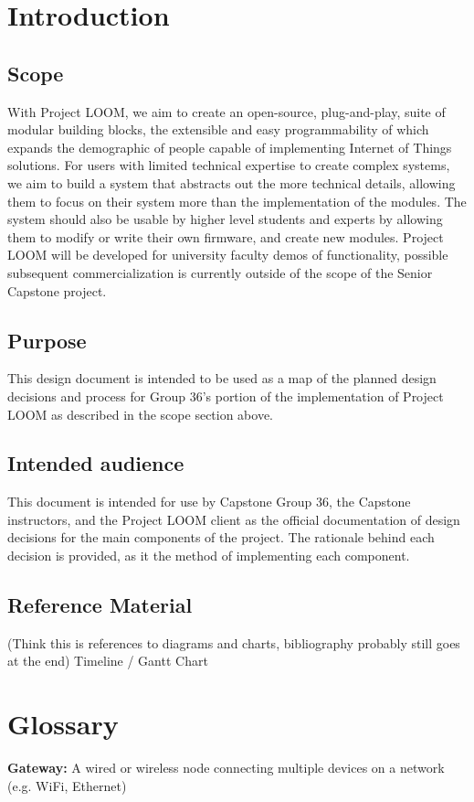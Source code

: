 \documentclass[onecolumn, draftclsnofoot,10pt, compsoc]{IEEEtran}
\begin{document}
\section{Introduction}
\subsection{Scope}  
With Project LOOM, we aim to create an open-source, plug-and-play, suite of modular building blocks, the extensible and easy programmability of which expands the demographic of people capable of implementing Internet of Things solutions. For users with limited technical expertise to create complex systems, we aim to build a system that abstracts out the more technical details, allowing them to focus on their system more than the implementation of the modules. The system should also be usable by higher level students and experts by allowing them to modify or write their own firmware, and create new modules. Project LOOM will be developed for university faculty demos of functionality, possible subsequent commercialization is currently outside of the scope of the Senior Capstone project.

\subsection{Purpose}
This design document is intended to be used as a map of the planned design decisions and process for Group 36's portion of the implementation of Project LOOM as described in the scope section above.
                
\subsection{Intended audience}
This document is intended for use by Capstone Group 36, the Capstone instructors, and the Project LOOM client as the official documentation of design decisions for the main components of the project. The rationale behind each decision is provided, as it the method of implementing each component.

\subsection{Reference Material} (Think this is references to diagrams and charts, bibliography probably still goes at the end)
Timeline / Gantt Chart




\section{Glossary}
\textbf{Gateway:} A wired or wireless node connecting multiple devices on a network (e.g. WiFi, Ethernet)
\end{document}
